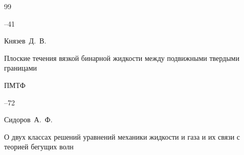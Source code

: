 \begin{thebibliography}{99}


--41

















\by Князев~Д.~В.

\paper Плоские течения вязкой бинарной жидкости между подвижными твердыми границами

\jour ПМТФ




--72


















\by Сидоров~А.~Ф.

\paper О двух классах решений уравнений механики жидкости и газа и их связи с теорией бегущих волн


\end{thebibliography}
